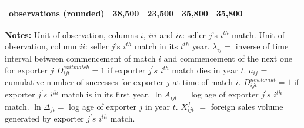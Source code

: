 \documentclass[12pt]{article}
\begin{document}
\begin{table}[tbp]
{\begin{tabular}{lllll}
observations (rounded) & 38,500 & 23,500 & 35,800 & 35,800 \\ \hline
\end{tabular}
}\endcenter
\par
\begin{tablenotes}
\item \textbf{Notes:}     {\footnotesize Unit of observation, columns $i$,  $iii$ and $iv$: seller $ j$'s $i^{th}$ match. Unit of observation, column $ii$: seller $ j$'s $i^{th}$ match in its $t^{th}$ year. $\lambda_{ij}=$ inverse of time interval between commencement of match $i$ and commencement of the next one for exporter $j$ $D_{ijt}^{exit match}=1$ if exporter $j^{\prime }s$ $i^{th}$ match dies in year $t$. $a_{ij} $ = cumulative number of successes for exporter $j$ at time of match $i$. $D_{ijt}^{new to mkt}=1$ if exporter $j^{\prime }s$ $i^{th}$ match is in its first year. $\ln A_{ijt}=$ log age of exporter $j^{\prime }s$ $i^{th}$  match. $\ln \Delta_{jt} =$ log age of exporter $j$ in year $t$. $X_{ijt}^{f}$ $=$ foreign sales volume generated by exporter $j^{\prime }s$ $i^{th}$ match.}
\end{tablenotes}
\end{table}
\end{document}

